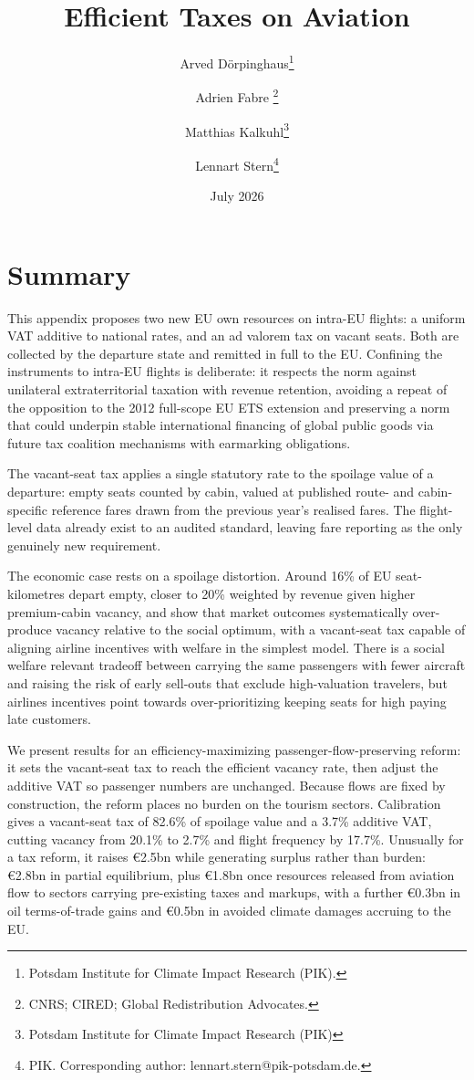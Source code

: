 \documentclass{article}
\title{Efficient Taxes on Aviation} %
\author{Arved Dörpinghaus\thanks{Potsdam Institute for Climate Impact Research (PIK).} \and Adrien Fabre \thanks{CNRS; CIRED; Global Redistribution Advocates.} \and Matthias Kalkuhl\thanks{Potsdam Institute for Climate Impact Research (PIK)} \and Lennart Stern\thanks{PIK. Corresponding author: lennart.stern@pik-potsdam.de.} }
\date{July 2026}
\begin{document}
\maketitle
\section{Summary}
This appendix proposes two new EU own resources on intra-EU flights: a uniform VAT additive to national rates, and an ad valorem tax on vacant seats. Both are collected by the departure state and remitted in full to the EU. Confining the instruments to intra-EU flights is deliberate: it respects the norm against unilateral extraterritorial taxation with revenue retention, avoiding a repeat of the opposition to the 2012 full-scope EU ETS extension and preserving a norm that could underpin stable international financing of global public goods via future tax coalition mechanisms with earmarking obligations.

The vacant-seat tax applies a single statutory rate to the spoilage value of a departure: empty seats counted by cabin, valued at published route- and cabin-specific reference fares drawn from the previous year's realised fares. The flight-level data already exist to an audited standard, leaving fare reporting as the only genuinely new requirement.

The economic case rests on a spoilage distortion. Around 16\% of EU seat-kilometres depart empty, closer to 20\% weighted by revenue given higher premium-cabin vacancy, and \citet{Dörpinghaus_et_al_2026} show that market outcomes systematically over-produce vacancy relative to the social optimum, with a vacant-seat tax capable of aligning airline incentives with welfare in the simplest model. There is a social welfare relevant tradeoff between carrying the same passengers with fewer aircraft and raising the risk of early sell-outs that exclude high-valuation travelers, but airlines incentives point towards over-prioritizing keeping seats for high paying late customers.

We present results for an efficiency-maximizing passenger-flow-preserving reform: it sets the vacant-seat tax to reach the efficient vacancy rate, then adjust the additive VAT so passenger numbers are unchanged. Because flows are fixed by construction, the reform places no burden on the tourism sectors. Calibration gives a vacant-seat tax of 82.6\% of spoilage value and a 3.7\% additive VAT, cutting vacancy from 20.1\% to 2.7\% and flight frequency by 17.7\%. Unusually for a tax reform, it raises €2.5bn while generating surplus rather than burden: €2.8bn in partial equilibrium, plus €1.8bn once resources released from aviation flow to sectors carrying pre-existing taxes and markups, with a further €0.3bn in oil terms-of-trade gains and €0.5bn in avoided climate damages accruing to the EU.
\end{document}
